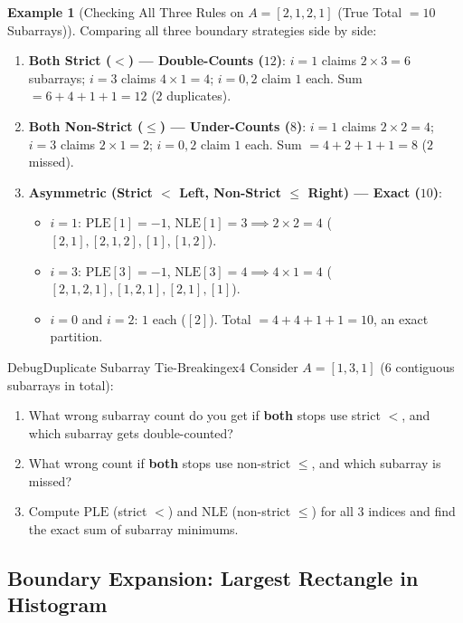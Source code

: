 \documentclass[11pt,a4paper]{article}
\theoremstyle{definition}
\newtheorem{example}{Example}[section]
\begin{document}
\begin{example}[Checking All Three Rules on $A = {[2, 1, 2, 1]}$ (True Total $= 10$ Subarrays)]
Comparing all three boundary strategies side by side:
\begin{enumerate}
    \item \textbf{Both Strict ($<$) --- Double-Counts ($12$)}: $i=1$ claims $2 \times 3 = 6$ subarrays; $i=3$ claims $4 \times 1 = 4$; $i=0, 2$ claim $1$ each. Sum $= 6 + 4 + 1 + 1 = 12$ ($2$ duplicates).
    \item \textbf{Both Non-Strict ($\le$) --- Under-Counts ($8$)}: $i=1$ claims $2 \times 2 = 4$; $i=3$ claims $2 \times 1 = 2$; $i=0, 2$ claim $1$ each. Sum $= 4 + 2 + 1 + 1 = 8$ ($2$ missed).
    \item \textbf{Asymmetric (Strict $<$ Left, Non-Strict $\le$ Right) --- Exact ($10$)}:
    \begin{itemize}
        \item $i = 1$: $\text{PLE}[1] = -1$, $\text{NLE}[1] = 3 \implies 2 \times 2 = 4$ ($[2, 1], [2, 1, 2], [1], [1, 2]$).
        \item $i = 3$: $\text{PLE}[3] = -1$, $\text{NLE}[3] = 4 \implies 4 \times 1 = 4$ ($[2, 1, 2, 1], [1, 2, 1], [2, 1], [1]$).
        \item $i = 0$ and $i = 2$: $1$ each ($[2]$). Total $= 4 + 4 + 1 + 1 = 10$, an exact partition.
    \end{itemize}
\end{enumerate}
\end{example}

\begin{tryitbox}{Debug}{Duplicate Subarray Tie-Breaking}{ex4}
Consider $A = [1, 3, 1]$ ($6$ contiguous subarrays in total):
\begin{enumerate}
    \item What wrong subarray count do you get if \textbf{both} stops use strict $<$, and which subarray gets double-counted?
    \item What wrong count if \textbf{both} stops use non-strict $\le$, and which subarray is missed?
    \item Compute $\text{PLE}$ (strict $<$) and $\text{NLE}$ (non-strict $\le$) for all $3$ indices and find the exact sum of subarray minimums.
\end{enumerate}
\end{tryitbox}

\subsection{Boundary Expansion: Largest Rectangle in Histogram}
\end{document}
